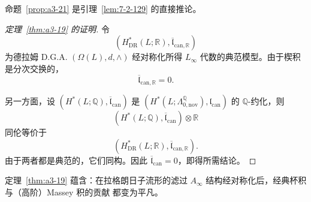 命题~\ref{prop:a3-21} 是引理~\ref{lem:7-2-129} 的直接推论。

\begin{proof}[定理~\ref{thm:a3-19} 的证明]
令
\[
 (H^*_{\mathrm{DR}}(L;\mathbb R),
   \overline{\mathfrak l}_{\mathrm{can},\mathbb R})
\]
为德拉姆 D.G.A. $(\Omega(L),d,\wedge)$ 经对称化所得
$L_\infty$ 代数的典范模型。由于楔积是分次交换的，
\[
 \overline{\mathfrak l}_{\mathrm{can},\mathbb R}=0.
\]

另一方面，设
$(H^*(L;\mathbb Q),\overline{\mathfrak l}_{\mathrm{can}})$ 是
$(H^*(L;\Lambda^{\mathbb Q}_{0,\mathrm{nov}}),
\mathfrak l_{\mathrm{can}})$ 的 $\mathbb Q$-约化，则
\[
 (H^*(L;\mathbb Q),\overline{\mathfrak l}_{\mathrm{can}})
 \otimes\mathbb R
\]
同伦等价于
\[
 (H^*_{\mathrm{DR}}(L;\mathbb R),
 \overline{\mathfrak l}_{\mathrm{can},\mathbb R}).
\]
由于两者都是典范的，它们同构。因此
$\overline{\mathfrak l}_{\mathrm{can}}=0$，即得所需结论。
\end{proof}

定理~\ref{thm:a3-19} 蕴含：在拉格朗日子流形的滤过
$A_\infty$ 结构经对称化后，经典杯积与（高阶）Massey 积的贡献
都变为平凡。

